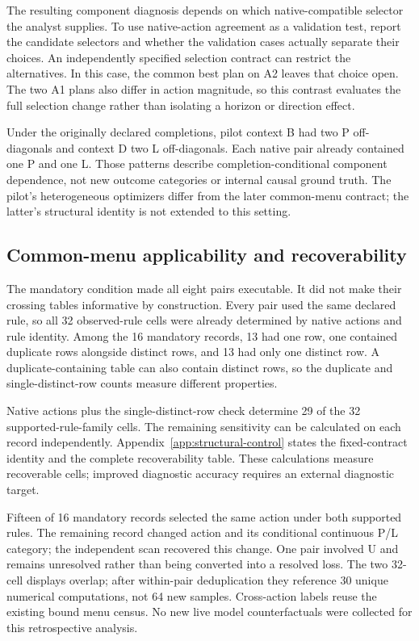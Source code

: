 The resulting component diagnosis depends on which native-compatible
selector the analyst supplies. To use native-action agreement as a validation
test, report the candidate selectors and whether the validation cases
actually separate their choices. An independently specified selection
contract can restrict the alternatives. In this case, the common best plan
on A2 leaves that choice open. The two A1 plans also differ in action
magnitude, so this contrast evaluates the full selection change rather than
isolating a horizon or direction effect.

Under the originally declared completions, pilot context B had two P
off-diagonals and context D two L off-diagonals. Each native pair already
contained one P and one L. Those patterns describe completion-conditional
component dependence, not new outcome categories or internal causal ground
truth. The pilot's heterogeneous optimizers differ from the later common-menu
contract; the latter's structural identity is not extended to this setting.

\subsection{Common-menu applicability and recoverability}
The mandatory condition made all eight pairs executable. It did not make
their crossing tables informative by construction. Every pair used the same
declared rule, so all 32 observed-rule cells were already determined by native
actions and rule identity. Among the 16 mandatory records, 13 had one row,
one contained duplicate rows alongside distinct rows, and 13 had only one
distinct row. A duplicate-containing table can also contain distinct rows, so the
duplicate and single-distinct-row counts measure different properties.

Native actions plus the single-distinct-row check determine 29 of the
32 supported-rule-family cells. The remaining sensitivity can be calculated on each record independently.
Appendix~\ref{app:structural-control} states the fixed-contract identity and
the complete recoverability table. These calculations measure recoverable
cells; improved diagnostic accuracy requires an external diagnostic target.


Fifteen of 16 mandatory records selected the same action under both supported
rules. The remaining record changed action and its conditional continuous
P/L category; the independent
scan recovered this change. One pair involved U and remains unresolved rather
than being converted into a resolved loss. The two 32-cell displays overlap;
after within-pair deduplication they reference 30 unique numerical computations,
not 64 new samples. Cross-action labels reuse the existing bound menu census.
No new live model counterfactuals were collected for this retrospective analysis.

